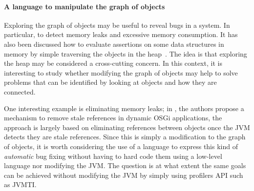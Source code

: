 

\paragraph{A language to manipulate the graph of objects}
Exploring the graph of objects may be useful to reveal bugs in a system.
In particular, to detect memory leaks and excessive memory consumption.
It has also been discussed how to evaluate assertions on some data structures in memory by simple traversing the objects in the heap~\cite{Reichenbach:2010:GCE:1869459.1869482}.
The idea is that exploring the heap may be considered a cross-cutting concern.
In this context, it is interesting to study whether modifying the graph of objects may help to solve problems that can be identified by looking at objects and how they are connected.

One interesting example is eliminating memory leaks; in \cite{dsn:15:attouchi:incinerator}, the authors propose a mechanism to remove stale references in dynamic OSGi applications, the approach is largely based on eliminating references between objects once the JVM detects they are stale references.
Since this is simply a modification to the graph of objects, it is worth considering the use of a language to express this kind of \textit{automatic}
bug fixing without having to hard code them using a low-level language nor modifying the JVM.
The question is at what extent the same goals can be achieved without modifying the JVM by simply using profilers API such as JVMTI.


